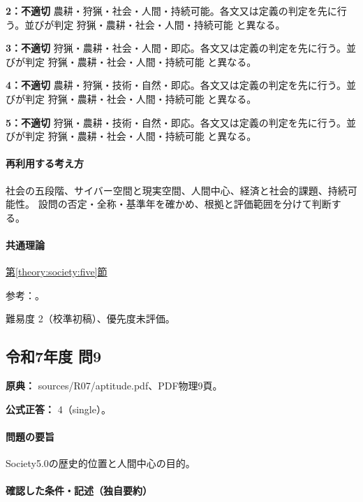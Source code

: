 \noindent\textbf{2：不適切} 農耕・狩猟・社会・人間・持続可能。各文又は定義の判定を先に行う。並びが判定 狩猟・農耕・社会・人間・持続可能 と異なる。\par

\noindent\textbf{3：不適切} 狩猟・農耕・社会・人間・即応。各文又は定義の判定を先に行う。並びが判定 狩猟・農耕・社会・人間・持続可能 と異なる。\par

\noindent\textbf{4：不適切} 農耕・狩猟・技術・自然・即応。各文又は定義の判定を先に行う。並びが判定 狩猟・農耕・社会・人間・持続可能 と異なる。\par

\noindent\textbf{5：不適切} 狩猟・農耕・技術・自然・即応。各文又は定義の判定を先に行う。並びが判定 狩猟・農耕・社会・人間・持続可能 と異なる。\par

\paragraph{再利用する考え方} 社会の五段階、サイバー空間と現実空間、人間中心、経済と社会的課題、持続可能性。 設問の否定・全称・基準年を確かめ、根拠と評価範囲を分けて判断する。

\paragraph{共通理論} \hyperref[theory:society:five]{第\ref*{theory:society:five}節}

\par 参考：\cite{eth54_society2021}。

\par 難易度 2（校準初稿）、優先度未評価。

\subsection{令和7年度 問9}
\label{q:r07-reg-apt-09}

\noindent\textbf{原典：} sources/R07/aptitude.pdf、PDF物理9頁。

\textbf{公式正答：} 4（single）。

\paragraph{問題の要旨} Society5.0の歴史的位置と人間中心の目的。

\paragraph{確認した条件・記述（独自要約）}\mbox{}\par

